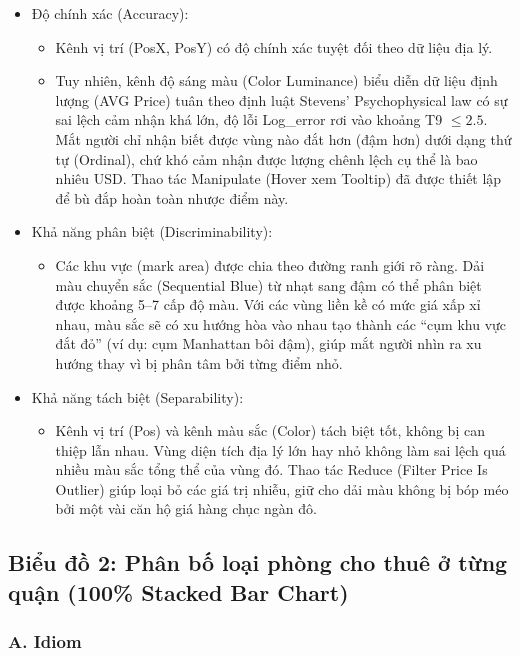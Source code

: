 \begin{itemize}
    \item Độ chính xác (Accuracy):
    \begin{itemize}
        \item Kênh vị trí (PosX, PosY) có độ chính xác tuyệt đối theo dữ liệu địa lý.
        \item Tuy nhiên, kênh độ sáng màu (Color Luminance) biểu diễn dữ liệu định lượng (AVG Price) tuân theo định luật Stevens' Psychophysical law có sự sai lệch cảm nhận khá lớn, độ lỗi Log\_error rơi vào khoảng T9 $\leq 2.5$. Mắt người chỉ nhận biết được vùng nào đắt hơn (đậm hơn) dưới dạng thứ tự (Ordinal), chứ khó cảm nhận được lượng chênh lệch cụ thể là bao nhiêu USD. Thao tác Manipulate (Hover xem Tooltip) đã được thiết lập để bù đắp hoàn toàn nhược điểm này.
    \end{itemize}
    \item Khả năng phân biệt (Discriminability):
    \begin{itemize}
        \item Các khu vực (mark area) được chia theo đường ranh giới rõ ràng. Dải màu chuyển sắc (Sequential Blue) từ nhạt sang đậm có thể phân biệt được khoảng 5--7 cấp độ màu. Với các vùng liền kề có mức giá xấp xỉ nhau, màu sắc sẽ có xu hướng hòa vào nhau tạo thành các ``cụm khu vực đắt đỏ'' (ví dụ: cụm Manhattan bôi đậm), giúp mắt người nhìn ra xu hướng thay vì bị phân tâm bởi từng điểm nhỏ.
    \end{itemize}
    \item Khả năng tách biệt (Separability):
    \begin{itemize}
        \item Kênh vị trí (Pos) và kênh màu sắc (Color) tách biệt tốt, không bị can thiệp lẫn nhau. Vùng diện tích địa lý lớn hay nhỏ không làm sai lệch quá nhiều màu sắc tổng thể của vùng đó. Thao tác Reduce (Filter Price Is Outlier) giúp loại bỏ các giá trị nhiễu, giữ cho dải màu không bị bóp méo bởi một vài căn hộ giá hàng chục ngàn đô.
    \end{itemize}
\end{itemize}

\subsection{Biểu đồ 2: Phân bố loại phòng cho thuê ở từng quận (100\% Stacked Bar Chart)}

\subsubsection*{A. Idiom}


